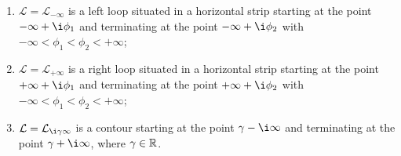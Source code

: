\begin{definition}
  \begin{enumerate}
    \item $\mathcal{L}=\mathcal{L}_{-\infty}$ is a left loop situated in a horizontal strip starting at the point $-\infty+\i \phi_1$ and terminating at the point $-\infty + \i \phi_2$ with $-\infty < \phi_1 < \phi_2 < +\infty$;
    \item $\mathcal{L}=\mathcal{L}_{+\infty}$ is a right loop situated in a horizontal strip starting at the point $+\infty+\i \phi_1$ and terminating at the point $+\infty + \i \phi_2$ with $-\infty < \phi_1 < \phi_2 < +\infty$;
    \item $\mathcal{L}=\mathcal{L}_{\i \gamma \infty}$ is a contour starting at the point $\gamma-\i \infty$ and terminating at the point $\gamma+\i \infty$, where $\gamma \in {\mathbb{R}}$.
  \end{enumerate}
\end{definition}
